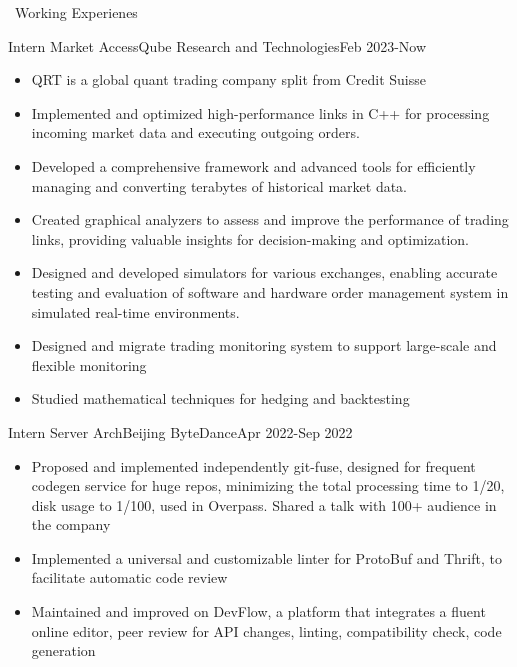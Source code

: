 \documentclass{resume}
\begin{document}
\begin{rSection}{\faUsers~Working Experienes}
    \begin{rExperience}{Intern Market Access}{Qube Research and Technologies}{Feb 2023-Now}
        \begin{itemize}
            \itemsep -0.5em \vspace{-0.5em}
            \item QRT is a global quant trading company split from Credit Suisse
            \item Implemented and optimized high-performance links in C++ for processing incoming market data and executing outgoing orders.
            \item Developed a comprehensive framework and advanced tools for efficiently managing and converting terabytes of historical market data.
            \item Created graphical analyzers to assess and improve the performance of trading links, providing valuable insights for decision-making and optimization.
            \item Designed and developed simulators for various exchanges, enabling accurate testing and evaluation of software and hardware order management system in simulated real-time environments.
            \item Designed and migrate trading monitoring system to support large-scale and flexible monitoring
            \item Studied mathematical techniques for hedging and backtesting
        \end{itemize}
    \end{rExperience}
    \begin{rExperience}{Intern Server Arch}{Beijing ByteDance}{Apr 2022-Sep 2022}
        \begin{itemize}
            \itemsep -0.5em \vspace{-0.5em}
            \item Proposed and implemented independently git-fuse, designed for frequent codegen service for huge repos, minimizing the total processing time to 1/20, disk usage to 1/100, used in Overpass. Shared a talk with 100+ audience in the company
            \item Implemented a universal and customizable linter for ProtoBuf and Thrift, to facilitate automatic code review
            \item Maintained and improved on DevFlow, a platform that integrates a fluent online editor, peer review for API changes, linting, compatibility check, code generation

\end{itemize}
\end{rExperience}
\end{rSection}
\end{document}
